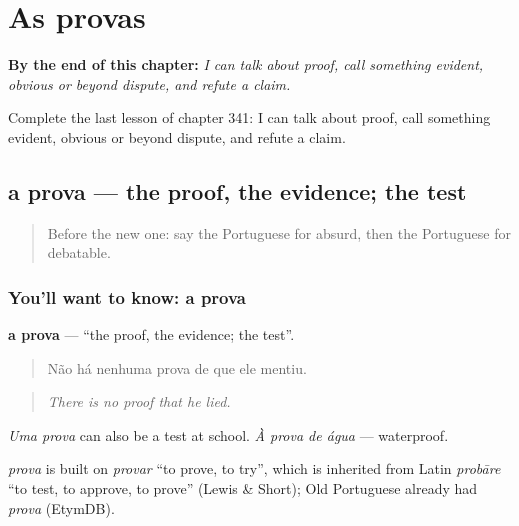 
\chapter{As provas}
\label{ch:pt-as-provas}

\begin{chapteropening}
\textbf{By the end of this chapter:} \emph{I can talk about proof, call something evident, obvious or beyond dispute, and refute a claim.}

Complete the last lesson of chapter 341: I can talk about proof, call something evident, obvious or beyond dispute, and refute a claim.
\end{chapteropening}

\section[a prova]{a prova — the proof, the evidence; the test}

\label{lesson:PT-C341-prova}



\begin{quote}
Before the new one: say the Portuguese for absurd, then the Portuguese for debatable.
\end{quote}

\subsection*{You'll want to know: a prova}
\textbf{a prova} — \textquotedblleft{}the proof, the evidence; the test\textquotedblright{}.

\begin{quote}
Não há nenhuma prova de que ele mentiu.
\end{quote}

\begin{quote}
\emph{There is no proof that he lied.}
\end{quote}

\emph{Uma prova} can also be a test at school. \emph{À prova de água} — waterproof.

\begin{cousinweb}
\emph{prova} is built on \emph{provar} \textquotedblleft{}to prove, to try\textquotedblright{}, which is inherited from Latin \emph{probāre} \textquotedblleft{}to test, to approve, to prove\textquotedblright{} (Lewis \& Short); Old Portuguese already had \emph{prova} (EtymDB).
\end{cousinweb}

